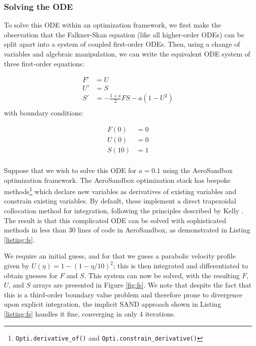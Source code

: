 \subsubsection{Solving the ODE}

To solve this ODE within an optimization framework, we first make the observation that the Falkner-Skan equation (like all higher-order ODEs) can be split apart into a system of coupled first-order ODEs. Then, using a change of variables and algebraic manipulation, we can write the equivalent ODE system of three first-order equations:

\begin{equation}
    \begin{aligned}
        F' &= U \\
        U' &= S \\
        S' &= -\frac{1 + a}{2}FS - a(1-U^2)\\
    \end{aligned}
\end{equation}
\noindent
with boundary conditions:

\begin{equation*}
    \begin{aligned}
        F(0) &= 0 \\
        U(0) &= 0 \\
        S(10) &= 1 \\
    \end{aligned}
    \label{eq:fs-rewritten}
\end{equation*}

Suppose that we wish to solve this ODE for $a=0.1$ using the AeroSandbox optimization framework. The AeroSandbox optimization stack has bespoke methods\footnote{\texttt{Opti.derivative_of()} and \texttt{Opti.constrain_derivative()}} which declare new variables as derivatives of existing variables and constrain existing variables. By default, these implement a direct trapezoidal collocation method for integration, following the principles described by Kelly \cite{mpk2017}. The result is that this complicated ODE can be solved with sophisticated methods in less than 30 lines of code in AeroSandbox, as demonstrated in Listing \ref{listing:fs}.

We require an initial guess, and for that we guess a parabolic velocity profile given by $U(\eta) = 1 - (1 - \eta/10)^2$; this is then integrated and differentiated to obtain guesses for $F$ and $S$. This system can now be solved, with the resulting $F$, $U$, and $S$ arrays are presented in Figure \ref{fig:fs}. We note that despite the fact that this is a third-order boundary value problem and therefore prone to divergence upon explicit integration, the implicit SAND approach shown in Listing \ref{listing:fs} handles it fine, converging in only 4 iterations.

